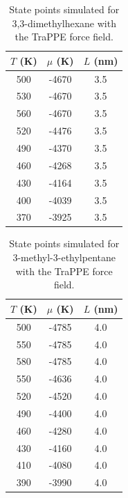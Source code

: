 \documentclass[journal=jctc,manuscript=article]{achemso}
\begin{document}
\begin{table}[htb!]
	\caption{State points simulated for 3,3-dimethylhexane with the TraPPE force field.}
	\begin{center}
		\begin{tabular}{|c|c|c|}
			\hline
			$T$ (K) & $\mu$ (K) & $L$ (nm) \\ \hline
			500	&	-4670	&	3.5	\\
			530	&	-4670	&	3.5	\\
			560	&	-4670	&	3.5	\\
			520	&	-4476	&	3.5	\\
			490	&	-4370	&	3.5	\\
			460	&	-4268	&	3.5	\\
			430	&	-4164	&	3.5	\\
			400	&	-4039	&	3.5	\\
			370	&	-3925	&	3.5	\\
			\hline
		\end{tabular}
	\end{center}
\end{table}

\begin{table}[htb!]
	\caption{State points simulated for 3-methyl-3-ethylpentane with the TraPPE force field.}
	\begin{center}
		\begin{tabular}{|c|c|c|}
			\hline
			$T$ (K) & $\mu$ (K) & $L$ (nm) \\ \hline
			500	&	-4785	&	4.0	\\
			550	&	-4785	&	4.0	\\
			580	&	-4785	&	4.0	\\
			550	&	-4636	&	4.0	\\
			520	&	-4520	&	4.0	\\
			490	&	-4400	&	4.0	\\
			460	&	-4280	&	4.0	\\
			430	&	-4160	&	4.0	\\
			410	&	-4080	&	4.0	\\
			390	&	-3990	&	4.0	\\
			\hline
		\end{tabular}
	\end{center}
\end{table}
\end{document}
